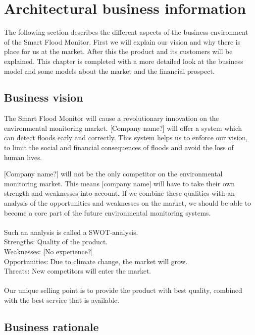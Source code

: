 \chapter{Architectural business information}
\label{ch:business}
The following section describes the different aspects of the business environment of the Smart Flood Monitor. First we will explain our vision and why there is place for us at the market. After this the product and its customers will be explained. This chapter is completed with a more detailed look at the business model and some models about the market and the financial prospect.

\section{Business vision}
The Smart Flood Monitor will cause a revolutionary innovation on the environmental monitoring market. [Company name?] will offer a system which can detect floods early and correctly. This system helps us to enforce our vision, to limit the social and financial consequences of floods and avoid the loss of human lives. 

[Company name?] will not be the only competitor on the environmental monitoring market. This means [company name] will have to take their own strength and weaknesses into account. If we combine these qualities with an analysis of the opportunities and weaknesses on the market, we should be able to become a core part of the future environmental monitoring systems.\\\\

Such an analysis is called a SWOT-analysis. 
\\
Strengths: Quality of the product.\\ 
Weaknesses: [No experience?]\\
Opportunities: Due to climate change, the market will grow. \\
Threats: New competitors will enter the market.\\\\

Our unique selling point is to provide the product with best quality, combined with the best service that is available.

\section{Business rationale}

